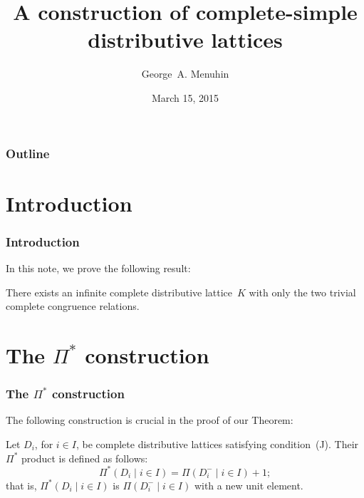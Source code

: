 \documentclass{beamer}
\begin{document}
\title{A construction of complete-simple\\  
       distributive lattices}
\author{George~A. Menuhin}
\date{March 15, 2015}

\begin{frame}
\titlepage
\end{frame}

\begin{frame}
\frametitle{Outline}

\tableofcontents[pausesections]
\end{frame}

\section{Introduction}

\begin{frame}
\frametitle{Introduction}

In this note, we prove the following result:

\begin{theorem} 
There exists an infinite complete distributive 
lattice~$K$ with only the two trivial complete 
congruence relations.
\end{theorem}
\end{frame}

\section{The $\Pi^{*}$ construction}

\begin{frame}
\frametitle{The $\Pi^{*}$ construction}

The following construction is crucial in the proof
of our Theorem:

\begin{definition} 
Let $D_{i}$, for $i \in I$, be complete distributive 
lattices satisfying condition~\textup{(J)}.  Their 
$\Pi^{*}$ product is defined as follows:
\[
   \Pi^{*} ( D_{i} \mid i \in I ) = 
   \Pi ( D_{i}^{-} \mid i \in I ) + 1;
\]
that is, $\Pi^{*} ( D_{i} \mid i \in I )$ is 
$\Pi ( D_{i}^{-} \mid i \in I )$ with a new 
unit element. 
\end{definition}
\end{frame}
\end{document}
